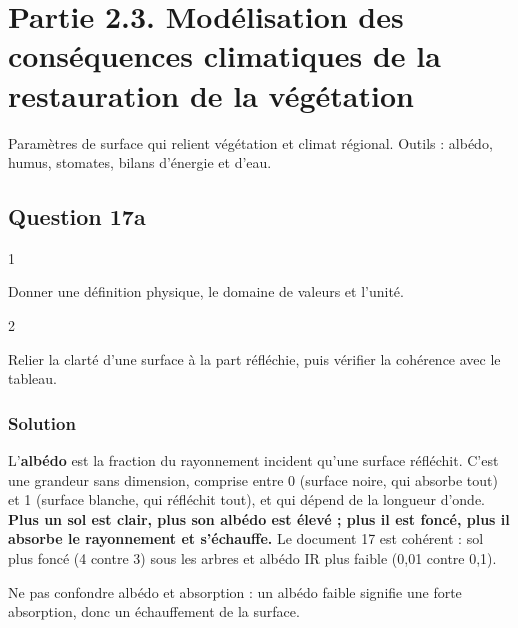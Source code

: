 \documentclass[11pt,a4paper]{article}
\begin{document}
\hypertarget{partie-2.3.-moduxe9lisation-des-consuxe9quences-climatiques-de-la-restauration-de-la-vuxe9guxe9tation}{%
\section{Partie 2.3. Modélisation des conséquences climatiques de la restauration de la végétation}\label{partie-2.3.-moduxe9lisation-des-consuxe9quences-climatiques-de-la-restauration-de-la-vuxe9guxe9tation}}

Paramètres de surface qui relient végétation et climat régional. Outils : albédo, humus, stomates, bilans d'énergie et d'eau.

\hypertarget{question-17a}{%
\subsection{Question 17a}\label{question-17a}}

\begin{indication}{1}

Donner une définition physique, le domaine de valeurs et l'unité.

\end{indication}

\begin{indication}{2}

Relier la clarté d'une surface à la part réfléchie, puis vérifier la cohérence avec le tableau.

\end{indication}

\hypertarget{solution-47}{%
\subsubsection{Solution}\label{solution-47}}

L'\textbf{albédo} est la fraction du rayonnement incident qu'une surface réfléchit. C'est une grandeur sans dimension, comprise entre 0 (surface noire, qui absorbe tout) et 1 (surface blanche, qui réfléchit tout), et qui dépend de la longueur d'onde. \textbf{Plus un sol est clair, plus son albédo est élevé ; plus il est foncé, plus il absorbe le rayonnement et s'échauffe.} Le document 17 est cohérent : sol plus foncé (4 contre 3) sous les arbres et albédo IR plus faible (0,01 contre 0,1).

\begin{piege}

Ne pas confondre albédo et absorption : un albédo faible signifie une forte absorption, donc un échauffement de la surface.

\end{piege}
\end{document}

